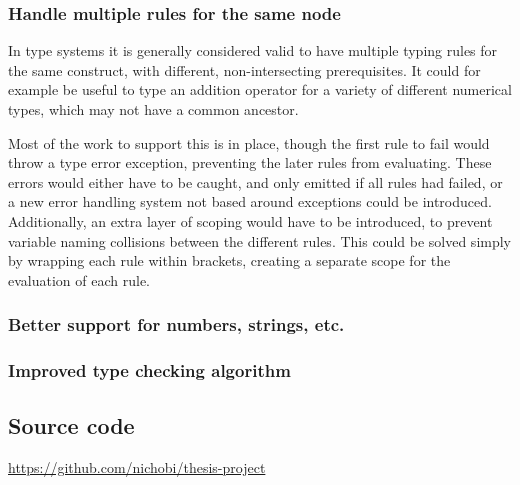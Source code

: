 \documentclass[nofilelist]{cslthse-msc}
\begin{document}
\subsection{Handle multiple rules for the same node}
In type systems it is generally considered valid to have multiple typing rules for the same construct, with different, non-intersecting prerequisites.
It could for example be useful to type an addition operator for a variety of different numerical types, which may not have a common ancestor.

Most of the work to support this is in place, though the first rule to fail would throw a type error exception, preventing the later rules from evaluating.
These errors would either have to be caught, and only emitted if all rules had failed, or a new error handling system not based around exceptions could be introduced.
Additionally, an extra layer of scoping would have to be introduced, to prevent variable naming collisions between the different rules.
This could be solved simply by wrapping each rule within brackets, creating a separate scope for the evaluation of each rule.

\subsection{Better support for numbers, strings, etc.}

\subsection{Improved type checking algorithm}


{} %

\begin{appendices} %
\chapter{Source code}
\url{https://github.com/nichobi/thesis-project}

\printfilelist

\checkoddpage
\ifoddpage
\else
  \newpage
  \thispagestyle{empty}
  \mbox{ }
\fi

\end{appendices}
\end{document}
